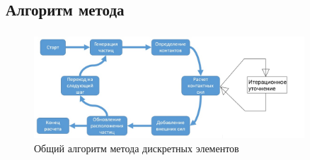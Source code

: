 \documentclass[c]{beamer}  %
\begin{document}
\subsection{Алгоритм метода}



\begin{frame}
\frametitle{\insertsection} 
\framesubtitle{\insertsubsection}

\begin{figure}[h!]
	\centering
	\includegraphics[width=0.9\textwidth]{algorithm}
	\caption{Общий алгоритм метода дискретных элементов}
\end{figure} 
\end{frame}
\end{document}
